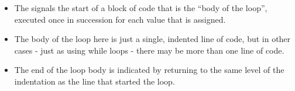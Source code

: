 \documentclass[letterpaper,10pt,english]{sphinxmanual}
\begin{document}
\begin{itemize}
\begin{itemize}
\begin{itemize}
\end{itemize}

\item {} 
The \sphinxcode{\sphinxupquote{:}} signals the start of a block of code that is the “body
of the loop”, executed once in succession for each value that
 is assigned.

\item {} 
The body of the loop here is just a single, indented line of
code, but in other cases - just as using while loops - there may
be more than one line of code.

\item {} 
The end of the loop body is indicated by returning to the same
level of the indentation as the  line that started
the loop.

\end{itemize}

\end{itemize}
\end{document}
